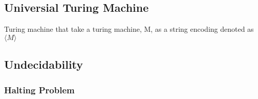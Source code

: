 \documentclass[11pt]{article}
\begin{document}
\subsection{Universial Turing Machine}
\label{sec-5.6}

   Turing machine that take a turing machine, M, as a string encoding
   denoted as $\langle M \rangle$

\subsection{Undecidability}
\label{sec-5.7}

\subsubsection{Halting Problem}
\label{sec-5.7.1}
\end{document}
